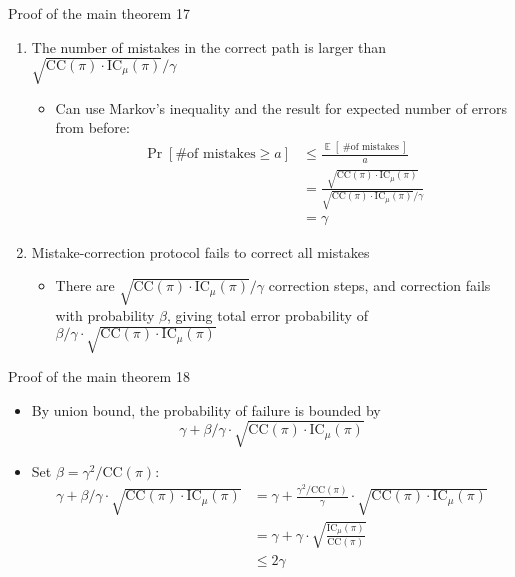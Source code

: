 \documentclass[10pt]{beamer}
\newcommand\E{\mathop{\mathbb{E}}}
\newcommand\CC{\textrm{CC}}
\newcommand\IC{\textrm{IC}}
\begin{document}
\begin{frame}{Proof of the main theorem 17}
\begin{enumerate}
    \vskip 0.3cm
    \item The number of mistakes in the correct path is larger than $\sqrt{\CC(\pi) \cdot \IC_\mu(\pi)}/\gamma$
    \begin{itemize}
    \pause
        \vskip 0.2cm
        \item Can use Markov's inequality and the result for expected number of errors from before:
        \begin{align*}
            \Pr[ \textrm{\# of mistakes} \geq  a ] &\leq \frac{\E[\; \textrm{\# of mistakes} \;]}{a}
            \\ &= \frac{\sqrt{\CC(\pi) \cdot \IC_\mu(\pi)}}{\sqrt{\CC(\pi) \cdot \IC_\mu(\pi)}/\gamma}
            \\ &= \gamma
        \end{align*} 
    \end{itemize}
    \vskip 0.3cm
    \pause
    \item Mistake-correction protocol fails to correct all mistakes
    \pause
    \begin{itemize}
        \vskip 0.2cm
        \item There are $\sqrt{\CC(\pi) \cdot \IC_\mu(\pi)}/\gamma$ correction steps, and correction fails with probability $\beta$, giving total error probability of $\beta/\gamma \cdot \sqrt{\CC(\pi) \cdot \IC_\mu(\pi)}$
    \end{itemize}
\end{enumerate}
\end{frame}

\begin{frame}{Proof of the main theorem 18}
\begin{itemize}
    \item By union bound, the probability of failure is bounded by
    $$\gamma + \beta/\gamma \cdot \sqrt{\CC(\pi) \cdot \IC_\mu(\pi)}$$
    \pause
    \item Set $\beta = \gamma^2 / \CC(\pi)$:
    \begin{align*}
        \gamma + \beta/\gamma \cdot \sqrt{\CC(\pi) \cdot \IC_\mu(\pi)} &= \gamma + \frac{\gamma^2 / \CC(\pi)}{\gamma} \cdot \sqrt{\CC(\pi) \cdot \IC_\mu(\pi)}
        \\ &= \gamma + \gamma \cdot \sqrt{\frac{\IC_\mu(\pi)}{\CC(\pi)}}
        \\ &\leq 2 \gamma
    \end{align*}
\end{itemize}
\end{frame}
\end{document}
